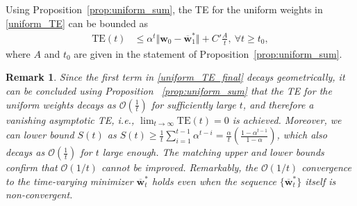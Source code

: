 \documentclass[conference]{IEEEtran}
\newcommand{\nm}[1]{\textcolor{magenta}{\bf [NM: #1]}}
\newtheorem{cor}{Corollary}
\newtheorem{remark}{Remark}
\begin{document}
Using Proposition~\ref{prop:uniform_sum}, the TE for the uniform weights in \eqref{uniform_TE} can be bounded as
\begin{align}
    \text{TE}(t)&\leq \alpha^{t}\Vert \mathbf{w}_{0} - \overline{\mathbf{w}}^*_{1}\Vert + C'\frac{A}{t}, \ \forall t\geq t_0,\label{uniform_TE_final}
\end{align}
where $A$ and $t_0$ are given in the statement of Proposition~\ref{prop:uniform_sum}.
\begin{remark} Since the first term in \eqref{uniform_TE_final} decays geometrically, it can be concluded using Proposition ~\ref{prop:uniform_sum} that the TE for the uniform weights decays as $\mathcal{O}\left(\frac{1}{t}\right)$ for sufficiently large $t$, and therefore a vanishing asymptotic TE, i.e., $\lim_{t\to\infty} \text{TE}(t) = 0$ is achieved. Moreover, we can lower bound $S(t)$ as $S(t) \geq \frac{1}{t}\sum_{i=1}^{t-1}\alpha^{t-i} = \frac{\alpha}{t}(\frac{1-\alpha^{t-1}}{1-\alpha})$, which also decays as $\mathcal{O}(\frac{1}{t})$ for $t$ large enough. The matching upper and lower bounds confirm that 
$\mathcal{O}(1/t)$ cannot be improved. Remarkably, the 
$\mathcal{O}(1/t)$ convergence to the time-varying minimizer $\overline{\mathbf{w}}^*_{t}$ holds even when the sequence $\{\overline{\mathbf{w}}^*_{t}\}$ itself is non-convergent. 
\end{remark}
\end{document}
